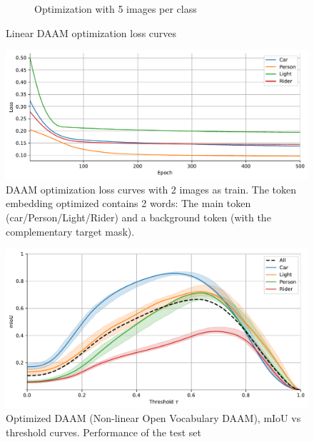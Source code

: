 \begin{figure}
\begin{subfigure}{0.9\columnwidth}
    \label{fig:apendix-loss-curves-5-image}
    \caption{Optimization with 5 images per class}
\end{subfigure}
    \caption[Linear DAAM optimization loss curves]{Linear DAAM optimization loss curves}
    \label{fig:apendix-loss-curves}
\end{figure}


\begin{figure}
    \centering
    \includegraphics[width=0.8\columnwidth]{img/6-appendix/optimization-curve-2-images-daam.pdf}
    \caption[DAAM optimization]{DAAM optimization loss curves with 2 images as train. The token embedding optimized contains 2 words: The main token (car/Person/Light/Rider) and a background token (with the complementary target mask).}
    \label{fig:miou-optimized-ious-daam}
\end{figure}


\begin{figure}
    \centering
    \includegraphics[width=1\columnwidth]{img/4-experiments/full-heatmap-optimized-iou-2-500-test-large.pdf}
    \caption[Optimized DAAM mIoU curves]{Optimized DAAM (Non-linear Open Vocabulary DAAM), mIoU vs threshold curves. Performance of the test set}
    \label{fig:miou-class-curves-daam-optimized}
\end{figure}


